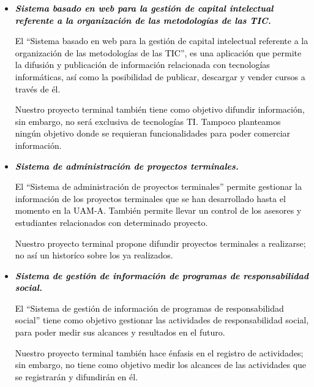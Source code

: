 \documentclass[11pt,letterpaper,titlepage]{article}
\begin{document}
\begin{itemize}

  \item \textcolor{black}{\textit{\textbf{Sistema basado en web para la gesti\'on de capital intelectual referente a la organizaci\'on de las metodolog\'ias de las TIC.}}}

\textcolor{black}{El ``Sistema basado en web para la gesti\'on de capital intelectual referente a la organizaci\'on de las metodolog\'ias de las TIC''\cite{*}, es una aplicaci\'on que permite la difusi\'on y publicaci\'on de informaci\'on relacionada con tecnolog\'ias inform\'aticas, as\'i como la posibilidad de publicar, descargar y vender cursos a trav\'es de \'el.}

\textcolor{black}{Nuestro proyecto terminal tambi\'en tiene como objetivo difundir informaci\'on, sin embargo, no ser\'a exclusiva de tecnolog\'ias TI. Tampoco planteamos ning\'un objetivo donde se requieran funcionalidades para poder comerciar informaci\'on.}

  \item \textcolor{black}{\textit{\textbf{Sistema de administraci\'on de proyectos terminales.}}}

\textcolor{black}{El ``Sistema de administraci\'on de proyectos terminales''\cite{*} permite gestionar la informaci\'on de los proyectos terminales que se han desarrollado hasta el momento en la UAM-A. Tambi\'en permite llevar un control de los asesores y estudiantes relacionados con determinado proyecto.}

\textcolor{black}{Nuestro proyecto terminal propone difundir proyectos terminales a realizarse; no as\'i un histor\'ico sobre los ya realizados.}

  \item \textcolor{black}{\textit{\textbf{Sistema de gesti\'on de informaci\'on de programas de responsabilidad social.}}}

\textcolor{black}{El ``Sistema de gesti\'on de informaci\'on de programas de responsabilidad social''\cite{*} tiene como objetivo gestionar las actividades de responsabilidad social, para poder medir sus alcances y resultados en el futuro.}

\textcolor{black}{Nuestro proyecto terminal tambi\'en hace \'enfasis en el registro de actividades; sin embargo, no tiene como objetivo medir los alcances de las actividades que se registrar\'an y difundir\'an en \'el.}

\end{itemize}
\end{document}
